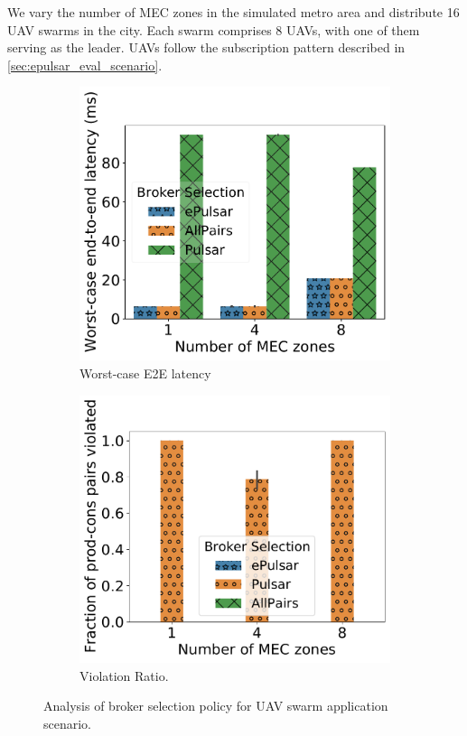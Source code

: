 \par We vary the number of MEC zones in the simulated metro area and distribute 16 UAV swarms in the city. Each swarm comprises 8 UAVs, with one of them serving as the leader. UAVs follow the subscription pattern described in \cref{sec:epulsar_eval_scenario}. 
\begin{figure}[ht]
\begin{subfigure}{.45\columnwidth}
  \centering
    \includegraphics[width=\columnwidth]{figures/epulsar/evals/latency.pdf}
    \caption{Worst-case E2E latency}
    \label{fig:brokersel_uav_latency}
\end{subfigure}
\begin{subfigure}{.45\columnwidth}
  \centering
    \includegraphics[width=\columnwidth]{figures/epulsar/evals/violation_ratio.pdf}
    \caption{Violation Ratio.}
    \label{fig:brokersel_uav_viol}
\end{subfigure}
\caption{Analysis of broker selection policy for UAV swarm application scenario.}
\label{fig:broker_sel_uav}
\end{figure}
